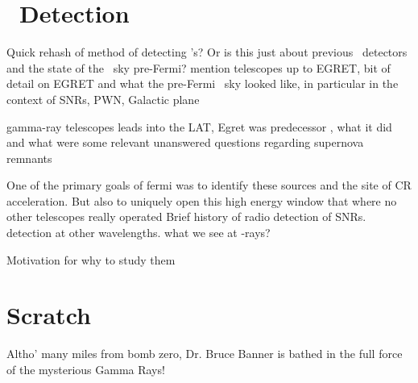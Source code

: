 \section{\gam~Detection}\label{gamAstr:Detect}
Quick rehash of method of detecting \gam's? Or is this just about previous \gam ~detectors and the state of the \gam~sky pre-Fermi?  mention telescopes up to EGRET, bit of detail on EGRET and what the pre-Fermi \gam~sky looked like, in particular in the context of SNRs, PWN, Galactic plane

gamma-ray telescopes leads into the LAT, Egret was  predecessor , what it did and what were some relevant unanswered questions regarding supernova remnants 


One of the primary goals of fermi was to identify these sources and the site of CR acceleration. But also to uniquely open this high energy window that where no other telescopes really operated
Brief history of radio detection of SNRs. detection at other wavelengths. what we see at \g-rays?

Motivation for why to study them
\citep{Sturner95}
\citep{Esposito96}

\section{Scratch}


Altho' many miles from bomb zero, Dr. Bruce Banner is bathed in the full force of the mysterious Gamma Rays!
